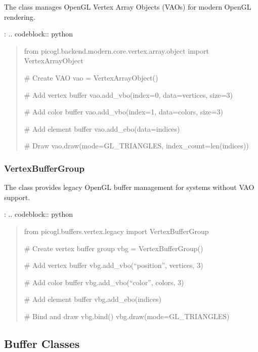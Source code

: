 \documentclass[a4paper,10pt,english,openany,oneside]{sphinxmanual}
\begin{document}
\sphinxAtStartPar
The  class manages OpenGL Vertex Array Objects (VAOs) for modern OpenGL rendering.

\sphinxAtStartPar
{}:
.. code\sphinxhyphen{}block:: python
\begin{quote}

\sphinxAtStartPar
from picogl.backend.modern.core.vertex.array.object import VertexArrayObject

\sphinxAtStartPar
\# Create VAO
vao = VertexArrayObject()

\sphinxAtStartPar
\# Add vertex buffer
vao.add\_vbo(index=0, data=vertices, size=3)

\sphinxAtStartPar
\# Add color buffer
vao.add\_vbo(index=1, data=colors, size=3)

\sphinxAtStartPar
\# Add element buffer
vao.add\_ebo(data=indices)

\sphinxAtStartPar
\# Draw
vao.draw(mode=GL\_TRIANGLES, index\_count=len(indices))
\end{quote}


\subsubsection{VertexBufferGroup}
\label{\detokenize{api/buffers:vertexbuffergroup}}
\sphinxAtStartPar
The  class provides legacy OpenGL buffer management for systems without VAO support.

\sphinxAtStartPar
{}:
.. code\sphinxhyphen{}block:: python
\begin{quote}

\sphinxAtStartPar
from picogl.buffers.vertex.legacy import VertexBufferGroup

\sphinxAtStartPar
\# Create vertex buffer group
vbg = VertexBufferGroup()

\sphinxAtStartPar
\# Add vertex buffer
vbg.add\_vbo(“position”, vertices, 3)

\sphinxAtStartPar
\# Add color buffer
vbg.add\_vbo(“color”, colors, 3)

\sphinxAtStartPar
\# Add element buffer
vbg.add\_ebo(indices)

\sphinxAtStartPar
\# Bind and draw
vbg.bind()
vbg.draw(mode=GL\_TRIANGLES)
\end{quote}


\subsection{Buffer Classes}
\label{\detokenize{api/buffers:buffer-classes}}
\end{document}
